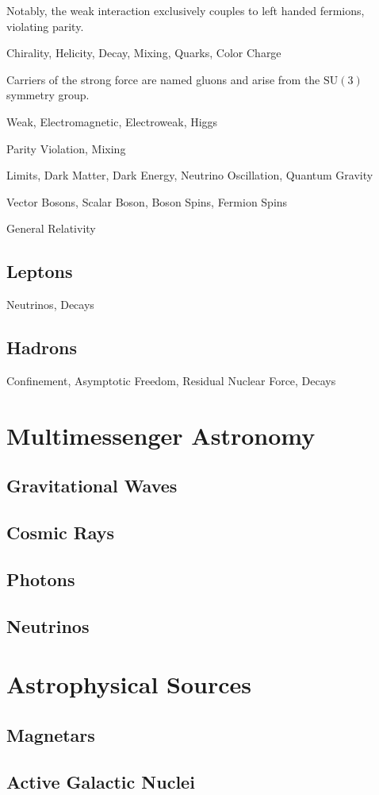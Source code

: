 \newpage

Notably, the weak interaction exclusively couples to left handed fermions, violating parity.

Chirality, Helicity, Decay, Mixing, Quarks, Color Charge

Carriers of the strong force are named gluons and arise from the $\text{SU}(3)$ symmetry group. 

Weak, Electromagnetic, Electroweak, Higgs

Parity Violation, Mixing

Limits, Dark Matter, Dark Energy, Neutrino Oscillation, Quantum Gravity

Vector Bosons, Scalar Boson, Boson Spins, Fermion Spins

General Relativity

\subsection*{Leptons}
\label{sub:leptons}

Neutrinos, Decays

\subsection*{Hadrons}
\label{sub:hadrons}

Confinement, Asymptotic Freedom, Residual Nuclear Force, Decays

\section{Multimessenger Astronomy}
\label{sec:multimessenger}

\subsection*{Gravitational Waves}
\label{sub:gravitational}

\subsection*{Cosmic Rays}
\label{sub:rays}

\subsection*{Photons}
\label{sub:photons}

\subsection*{Neutrinos}
\label{sub:neutrinos}

\section{Astrophysical Sources}
\label{sec:sources}

\subsection*{Magnetars}
\label{sub:magnetars}

\subsection*{Active Galactic Nuclei}
\label{sub:nuclei}
